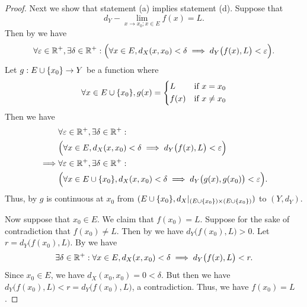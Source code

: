 \begin{proof}
  Next we show that statement (a) implies statement (d).
  Suppose that
  \[
    d_Y - \lim_{x \to x_0 ; x \in E} f(x) = L.
  \]
  Then by  we have
  \[
    \forall \varepsilon \in \mathbb{R}^+, \exists \delta \in \mathbb{R}^+ : \Big(\forall x \in E, d_X(x, x_0) < \delta \implies d_Y\big(f(x), L\big) < \varepsilon\Big).
  \]
  Let \(g : E \cup \left\lbrace x_0\right\rbrace \to Y\) be a function where
  \[
    \forall x \in E \cup \set{x_0}, g(x) = \begin{dcases}
      L    & \text{if } x = x_0    \\
      f(x) & \text{if } x \neq x_0
    \end{dcases}
  \]
  Then we have
  \begin{align*}
             & \forall \varepsilon \in \R^+, \exists \delta \in \R^+ :                                                          \\
             & \Big(\forall x \in E, d_X(x, x_0) < \delta \implies d_Y\big(f(x), L\big) < \varepsilon\Big)                      \\
    \implies & \forall \varepsilon \in \R^+, \exists \delta \in \R^+ :                                                          \\
             & \Big(\forall x \in E \cup \set{x_0}, d_X(x, x_0) < \delta \implies d_Y\big(g(x), g(x_0)\big) < \varepsilon\Big).
  \end{align*}
  Thus, by  \(g\) is continuous at \(x_0\) from \((E \cup \set{x_0}, d_X|_{(E \cup \set{x_0}) \times (E \cup \set{x_0})})\) to \((Y, d_Y)\).

  Now suppose that \(x_0 \in E\).
  We claim that \(f(x_0) = L\).
  Suppose for the sake of contradiction that \(f(x_0) \neq L\).
  Then by  we have \(d_Y\big(f(x_0), L\big) > 0\).
  Let \(r = d_Y\big(f(x_0), L\big)\).
  By  we have
  \[
    \exists \delta \in \mathbb{R}^+ : \forall x \in E, d_X(x, x_0) < \delta \implies d_Y\big(f(x), L\big) < r.
  \]
  Since \(x_0 \in E\), we have \(d_X(x_0, x_0) = 0 < \delta\).
  But then we have \(d_Y\big(f(x_0), L\big) < r = d_Y\big(f(x_0), L\big)\), a contradiction.
  Thus, we have \(f(x_0) = L\).


\end{proof}
